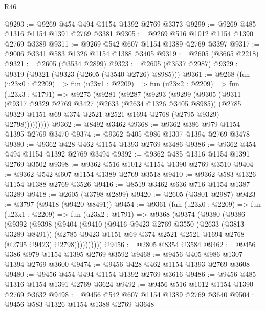\begin{lexlean}{R46}
\begin{coremodule}
@9293 := @9269 @454 @494 @1154 @1392 @2769 @3373
@9299 := @9269 @485 @1316 @1154 @1391 @2769 @3381
@9305 := @9269 @516 @1012 @1154 @1390 @2769 @3389
@9311 := @9269 @542 @607 @1154 @1389 @2769 @3397
@9317 := @9006 @3341 @583 @1326 @1154 @1388 @3405
@9319 := @2605 (@3665 @2218)
@9321 := @2605 (@3534 @2899)
@9323 := @2605 (@3537 @2987)
@9329 := @9319 (@9321 (@9323 (@2605 (@3540 @2726) @8985)))
@9361 := @9268
    (fun (u23x0 : @2209) =>
    fun (u23x1 : @2209) =>
    fun (u23x2 : @2209) =>
    fun (u23x3 : @1791) =>
    @9275
      (@9281
        (@9287
          (@9293
            (@9299
              (@9305
                (@9311
                  (@9317
                    @9329
                    @2769
                    @3427
                    (@2633 (@2634 @1326 @3405 @8985))
                    (@2785 @9329 @1151 @69 @374 @2521 @2521 @1694 @2768 (@2795 @9329) @2798)))))))))
@9362 := @8492 @3462
@9368 := @9362 @386 @979 @1154 @1395 @2769 @3470
@9374 := @9362 @405 @986 @1307 @1394 @2769 @3478
@9380 := @9362 @428 @462 @1154 @1393 @2769 @3486
@9386 := @9362 @454 @494 @1154 @1392 @2769 @3494
@9392 := @9362 @485 @1316 @1154 @1391 @2769 @3502
@9398 := @9362 @516 @1012 @1154 @1390 @2769 @3510
@9404 := @9362 @542 @607 @1154 @1389 @2769 @3518
@9410 := @9362 @583 @1326 @1154 @1388 @2769 @3526
@9416 := @8519 @3462 @636 @716 @1154 @1387 @3289
@9418 := @2605 (@3798 @2899)
@9420 := @2605 (@3801 @2987)
@9423 := @3797 (@9418 (@9420 @8491))
@9454 := @9361
    (fun (u23x0 : @2209) =>
    fun (u23x1 : @2209) =>
    fun (u23x2 : @1791) =>
    @9368
      (@9374
        (@9380
          (@9386
            (@9392
              (@9398
                (@9404
                  (@9410
                    (@9416
                      @9423
                      @2769
                      @3550
                      (@2633 (@3813 @3289 @8491))
                      (@2785
                        @9423
                        @1151
                        @69
                        @374
                        @2521
                        @2521
                        @1694
                        @2768
                        (@2795 @9423)
                        @2798))))))))))
@9456 := @2805 @8354 @3584
@9462 := @9456 @386 @979 @1154 @1395 @2769 @3592
@9468 := @9456 @405 @986 @1307 @1394 @2769 @3600
@9474 := @9456 @428 @462 @1154 @1393 @2769 @3608
@9480 := @9456 @454 @494 @1154 @1392 @2769 @3616
@9486 := @9456 @485 @1316 @1154 @1391 @2769 @3624
@9492 := @9456 @516 @1012 @1154 @1390 @2769 @3632
@9498 := @9456 @542 @607 @1154 @1389 @2769 @3640
@9504 := @9456 @583 @1326 @1154 @1388 @2769 @3648

\end{coremodule}
\end{lexlean}
